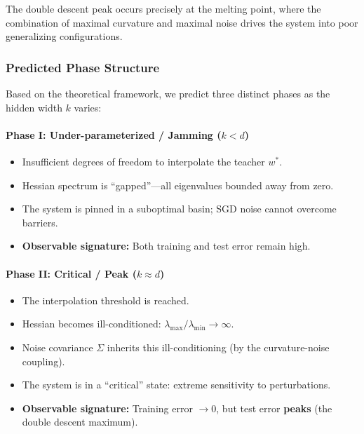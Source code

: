 \documentclass[
  journal=largetwo,
  simfonts=false,
  year=2025,
  volume=37,
]{cup-journal}
\begin{document}
The double descent peak occurs precisely at the melting point, where the combination of maximal curvature and maximal noise drives the system into poor generalizing configurations.

\subsubsection{Predicted Phase Structure}

Based on the theoretical framework, we predict three distinct phases as the hidden width $k$ varies:

\paragraph{Phase I: Under-parameterized / Jamming ($k < d$)}
\begin{itemize}
    \item Insufficient degrees of freedom to interpolate the teacher $w^*$.
    \item Hessian spectrum is ``gapped''---all eigenvalues bounded away from zero.
    \item The system is pinned in a suboptimal basin; SGD noise cannot overcome barriers.
    \item \textbf{Observable signature:} Both training and test error remain high.
\end{itemize}

\paragraph{Phase II: Critical / Peak ($k \approx d$)}
\begin{itemize}
    \item The interpolation threshold is reached.
    \item Hessian becomes ill-conditioned: $\lambda_{\max}/\lambda_{\min} \to \infty$.
    \item Noise covariance $\Sigma$ inherits this ill-conditioning (by the curvature-noise coupling).
    \item The system is in a ``critical'' state: extreme sensitivity to perturbations.
    \item \textbf{Observable signature:} Training error $\to 0$, but test error \textbf{peaks} (the double descent maximum).
\end{itemize}
\end{document}
